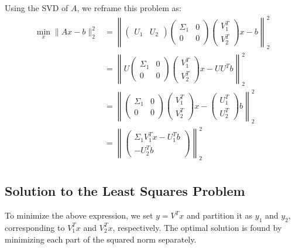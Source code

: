 Using the SVD of $A$, we reframe this problem as:
\[
\begin{aligned}
    \min_x \| Ax - b \|_2^2 &=
    \left\|
        \begin{pmatrix} U_1 & U_2 \end{pmatrix}
        \begin{pmatrix} \Sigma_1 & 0 \\ 0 & 0 \end{pmatrix}
        \begin{pmatrix} V_1^T \\ V_2^T \end{pmatrix}
        x - b
    \right\|_2^2 \\
    & = \left\|
        U \begin{pmatrix}
        \Sigma_1 & 0 \\
        0 & 0 
        \end{pmatrix}
        \begin{pmatrix}
            V_1^T \\
            V_2^T
        \end{pmatrix}
        x - UU^T b
    \right\|_2^2 \\
    & = \left\|
    \begin{pmatrix}
        \Sigma_1 & 0 \\
        0 & 0 
        \end{pmatrix}
        \begin{pmatrix}
            V_1^T \\
            V_2^T
        \end{pmatrix}
        x - 
        \begin{pmatrix}
            U_1^T \\
            U_2^T
        \end{pmatrix}b
    \right\|_2^2 \\
    & = \left\|
        \begin{pmatrix}
            \Sigma_1 V_1^T x - U_1^T b\\
            - U_2^T b
        \end{pmatrix}
    \right\|_2^2 \\
\end{aligned}
\]

\subsection*{Solution to the Least Squares Problem}
To minimize the above expression, we set $y = V^T x$ and partition it as $y_1$ and $y_2$, corresponding to $V_1^T x$ and $V_2^T x$, respectively. The optimal solution is found by minimizing each part of the squared norm separately.

